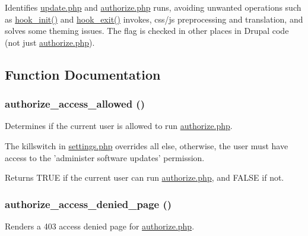 Identifies \hyperlink{update_8php}{update.php} and \hyperlink{authorize_8php}{authorize.php} runs, avoiding unwanted operations such as \hyperlink{group__hooks_ga74edef0c463436fdbb1f92ef367db051}{hook\_\-init()} and \hyperlink{group__hooks_gaab945bbc2e651510aee460dcc8691366}{hook\_\-exit()} invokes, css/js preprocessing and translation, and solves some theming issues. The flag is checked in other places in Drupal code (not just \hyperlink{authorize_8php}{authorize.php}). 

\subsection{Function Documentation}
\hypertarget{authorize_8php_a6c899eb6e61092e6ee83d40deccd8127}{
\subsubsection[{authorize\_\-access\_\-allowed}]{\setlength{\rightskip}{0pt plus 5cm}authorize\_\-access\_\-allowed ()}}
\label{authorize_8php_a6c899eb6e61092e6ee83d40deccd8127}
Determines if the current user is allowed to run \hyperlink{authorize_8php}{authorize.php}.

The killswitch in \hyperlink{settings_8php}{settings.php} overrides all else, otherwise, the user must have access to the 'administer software updates' permission.

\begin{DoxyReturn}{Returns}
TRUE if the current user can run \hyperlink{authorize_8php}{authorize.php}, and FALSE if not. 
\end{DoxyReturn}
\hypertarget{authorize_8php_a4efdfa86d88a6a411a42e86d322dacc8}{
\subsubsection[{authorize\_\-access\_\-denied\_\-page}]{\setlength{\rightskip}{0pt plus 5cm}authorize\_\-access\_\-denied\_\-page ()}}
\label{authorize_8php_a4efdfa86d88a6a411a42e86d322dacc8}
Renders a 403 access denied page for \hyperlink{authorize_8php}{authorize.php}. 